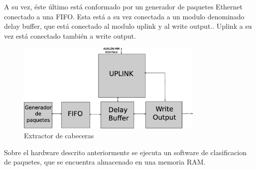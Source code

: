 A su vez, éste último está conformado por un generador de paquetes Ethernet conectado a una FIFO. Esta está a su vez conectada a un modulo denominado delay buffer, que está conectado al modulo uplink y al write output.. Uplink a su vez está conectado también a write output.

\begin{figure}[h]
  \centering
	\includegraphics[width=0.80\textwidth]{2-sistema/graf/extractor.eps}
  \caption{Extractor de cabeceras}
  \label{fig}
\end{figure}

Sobre el hardware descrito anteriormente se ejecuta un software de clasificacion de paquetes, que se encuentra almacenado en una memoria RAM.



